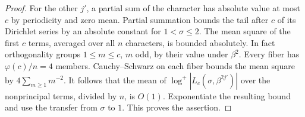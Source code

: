 \documentclass[a4paper,11pt]{article}
\theoremstyle{definition}
\theoremstyle{remark}
\numberwithin{equation}{section}
\begin{document}
\begin{proof}
For the other \(j'\), a partial sum of the character has
absolute value at most \(c\) by periodicity and zero mean.
Partial summation bounds the tail after \(c\) of its Dirichlet
series by an absolute constant for \(1<\sigma\le2\).
The mean square of the first \(c\) terms, averaged over all
\(n\) characters, is bounded absolutely. In fact
orthogonality groups \(1\le m\le c\), \(m\) odd, by their
value under \(\beta^2\). Every fiber has
\(\varphi(c)/n=4\) members. Cauchy--Schwarz on each fiber
bounds the mean square by \(4\sum_{m\ge1}m^{-2}\).
It follows that the mean of \(\log^+|L_c(\sigma,\beta^{2j'})|\)
over the nonprincipal terms, divided by \(n\), is \(O(1)\).
Exponentiate the resulting bound and use the transfer from
\(\sigma\) to \(1\). This proves the assertion.
\end{proof}
\end{document}
